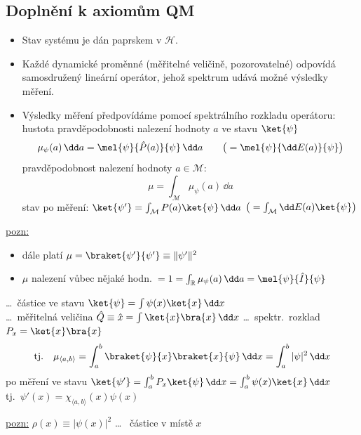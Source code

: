 \subsection*{Doplnění k axiomům QM}
\begin{veta}[Axiomy QM]
\begin{itemize}[nosep]
  \item[\fbox{A1}] Stav systému je dán paprskem v $\mathcal{H}$.
  \item[\fbox{A2}] Každé dynamické proměnné (měřitelné veličině, pozorovatelné) odpovídá samosdružený lineární operátor, jehož spektrum udává možné výsledky měření.
  \item[\fbox{A3}] Výsledky měření předpovídáme pomocí spektrálního rozkladu operátoru: \\
  hustota pravděpodobnosti nalezení hodnoty $a$ ve stavu $\ket{\psi}$
  \[
    \mu_\psi(a)\,\dd a = \mel{\psi}{\hat P(a)}{\psi}\,\dd a \qquad \big(= \mel{\psi}{\dd E(a)}{\psi}\big)
  \]
  pravděpodobnost nalezení hodnoty $a\in\mathcal{M}$:
  \[
    \mu = \int_{\mathcal{M}}\mu_\psi(a)\,\dd a
  \]
  stav po měření: \quad $\ket{\psi'} = \int_{\mathcal{M}}P(a)\ket{\psi}\,\dd a$ \quad $\big(= \int_{\mathcal{M}}\dd E(a)\ket{\psi}\big)$
\end{itemize}
\end{veta}

\underline{pozn:}
\begin{itemize}[nosep]
  \item[--] dále platí \quad $\mu = \braket{\psi'}{\psi'} \equiv \|\psi'\|^2$ \quad
  \item[--] $\mu$ nalezení vůbec nějaké hodn.\ $= 1 = \int_{\mathbb{R}}\mu_\psi(a)\,\dd a = \mel{\psi}{\hat I}{\psi}$ \quad {}
\end{itemize}

\begin{priklad}
\dots\ částice ve stavu $\ket{\psi} = \int\psi(x)\ket{x}\,\dd x$ \\
\dots\ měřitelná veličina \quad $\hat Q\equiv\hat x = \int\ket{x}\bra{x}\,\dd x$ \quad \dots\ spektr.\ rozklad $P_x = \ket{x}\bra{x}$
\[
  \text{tj.}\quad \mu_{\langle a,b\rangle} = \int_a^b\braket{\psi}{x}\braket{x}{\psi}\,\dd x = \int_a^b|\psi|^2\,\dd x
\]
po měření ve stavu \quad $\ket{\psi'} = \int_a^bP_x\ket{\psi}\,\dd x = \int_a^b\psi(x)\ket{x}\,\dd x$ \\
\phantom{po měření ve stavu} \quad tj.\ $\psi'(x) = \chi_{\langle a,b\rangle}(x)\psi(x)$
\end{priklad}
\underline{pozn:} \quad $\rho(x)\equiv|\psi(x)|^2$ \quad \dots\  částice v místě $x$

